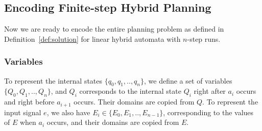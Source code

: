 \documentclass[sigconf]{acmart}
\begin{document}





\subsection{Encoding Finite-step Hybrid Planning}
Now we are ready to encode the entire planning problem as defined in Definition~\ref{def:solution} for linear hybrid automata with $n$-step runs.
\label{sec:milp:constraints}
\subsubsection{Variables}\label{section:milp:var}

To represent the internal states $\{q_0, q_1, .., q_n\}$, we define a set of variables $\{Q_0, Q_1,.., Q_n\}$, and $Q_i$ corresponds to the internal state $Q_i$ right after $a_i$ occurs and right before $a_{i+1}$ occurs. Their domains are copied from $Q$. To represent the input signal $e$, we also have $E_i \in \{E_0,E_1,..,E_{n-1}\}$, corresponding to the values of $E$ when $a_i$ occurs, and their domains are copied from $E$.  
\end{document}
